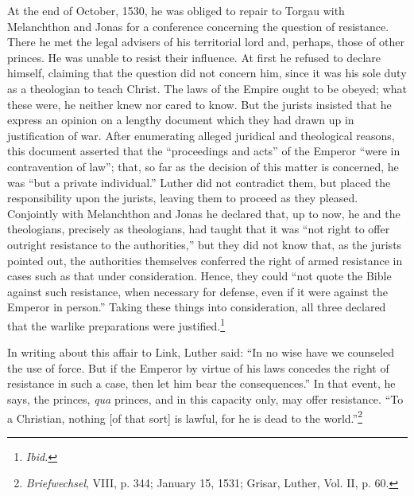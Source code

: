 At the end of October, 1530, he was obliged to repair to Torgau
with Melanchthon and Jonas for a conference concerning the question
of resistance. There he met the legal advisers of his territorial
lord and, perhaps, those of other princes. He was unable to resist
their influence. At first he refused to declare himself, claiming that
the question did not concern him, since it was his sole duty as a
theologian to teach Christ. The laws of the Empire ought to be
obeyed; what these were, he neither knew nor cared to know. But
the jurists insisted that he express an opinion on a lengthy document
which they had drawn up in justification of war.
After enumerating alleged juridical and theological reasons, this document
asserted that the “proceedings and acts” of the Emperor “were in
contravention of law”; that, so far as the decision of this matter is
concerned, he was “but a private individual.” Luther did not contradict
them, but placed the responsibility upon the jurists, leaving
them to proceed as they pleased. Conjointly with Melanchthon and
Jonas he declared that, up to now, he and the theologians, precisely
as theologians, had taught that it was “not right to offer outright
resistance to the authorities,” but they did not know that, as the
jurists pointed out, the authorities themselves conferred the right of
armed resistance in cases such as that under consideration. Hence,
they could “not quote the Bible against such resistance, when necessary
for defense, even if it were against the Emperor in person.”
Taking these things into consideration, all three declared that the
warlike preparations were justified.\footnote{\textit{Ibid.}}

In writing about this affair to Link, Luther said: “In no wise
have we counseled the use of force. But if the Emperor by virtue of
his laws concedes the right of resistance in such a case, then let
him bear the consequences.” In that event, he says, the princes,
\textit{qua} princes, and in this capacity only, may offer resistance. “To
a Christian, nothing [of that sort] is lawful, for he is dead to the
world.”\footnote{\textit{Briefwechsel}, VIII, p. 344; January 15, 1531; Grisar, Luther, Vol. II, p. 60.}

